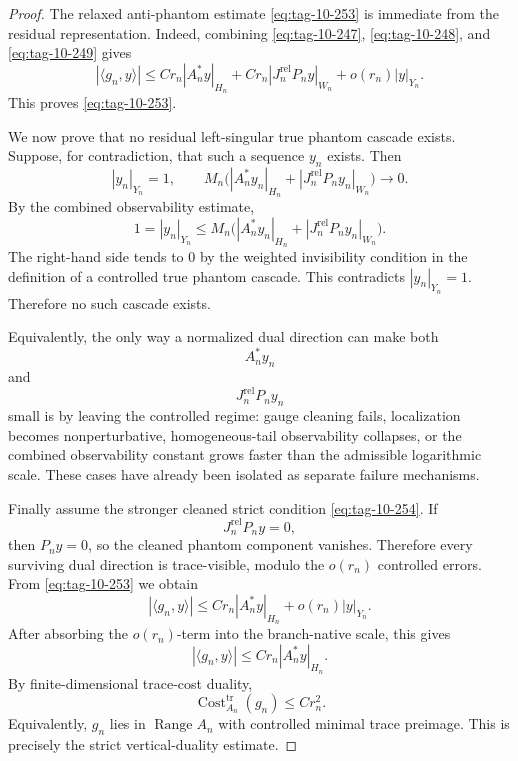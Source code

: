 \documentclass[10pt,a4paper]{amsart}
\begin{document}
\begin{proof}
The relaxed anti-phantom estimate \eqref{eq:tag-10-253} is immediate from the residual representation. Indeed, combining \eqref{eq:tag-10-247}, \eqref{eq:tag-10-248}, and \eqref{eq:tag-10-249} gives
\[
|\langle g_n,y\rangle|
\le
C r_n|A_n^*y|_{H_n}
+
C r_n|J_n^{\mathrm{rel}}P_n y|_{W_n}
+
o(r_n)|y|_{Y_n}.
\]
This proves \eqref{eq:tag-10-253}.

We now prove that no residual left-singular true phantom cascade exists. Suppose, for contradiction, that such a sequence \(y_n\) exists. Then
\[
|y_n|_{Y_n}=1,
\qquad
M_n\Big(|A_n^*y_n|_{H_n}+|J_n^{\mathrm{rel}}P_n y_n|_{W_n}\Big)\to0.
\]
By the combined observability estimate,
\begin{equation}
1 =
|y_n|_{Y_n}
\le
M_n\Big(
|A_n^*y_n|_{H_n}
+
|J_n^{\mathrm{rel}}P_n y_n|_{W_n}
\Big).
\label{eq:tag-10-257}
\end{equation}
The right-hand side tends to \(0\) by the weighted invisibility condition in the definition of a controlled true phantom cascade. This contradicts \(|y_n|_{Y_n}=1\). Therefore no such cascade exists.

Equivalently, the only way a normalized dual direction can make both
\[
A_n^*y_n
\]
and
\[
J_n^{\mathrm{rel}}P_ny_n
\]
small is by leaving the controlled regime: gauge cleaning fails, localization becomes nonperturbative, homogeneous-tail observability collapses, or the combined observability constant grows faster than the admissible logarithmic scale. These cases have already been isolated as separate failure mechanisms.

Finally assume the stronger cleaned strict condition \eqref{eq:tag-10-254}. If
\[
J_n^{\mathrm{rel}}P_ny=0,
\]
then \(P_ny=0\), so the cleaned phantom component vanishes. Therefore every surviving dual direction is trace-visible, modulo the \(o(r_n)\) controlled errors. From \eqref{eq:tag-10-253} we obtain
\[
|\langle g_n,y\rangle|
\le
C r_n|A_n^*y|_{H_n}
+
o(r_n)|y|_{Y_n}.
\]
After absorbing the \(o(r_n)\)-term into the branch-native scale, this gives
\[
|\langle g_n,y\rangle|
\le
C r_n|A_n^*y|_{H_n}.
\]
By finite-dimensional trace-cost duality,
\[
\operatorname{Cost}^{\operatorname{tr}}_{A_n}(g_n)
\le
C r_n^2.
\]
Equivalently, \(g_n\) lies in \(\operatorname{Range}A_n\) with controlled minimal trace preimage. This is precisely the strict vertical-duality estimate.
\end{proof}
\end{document}
